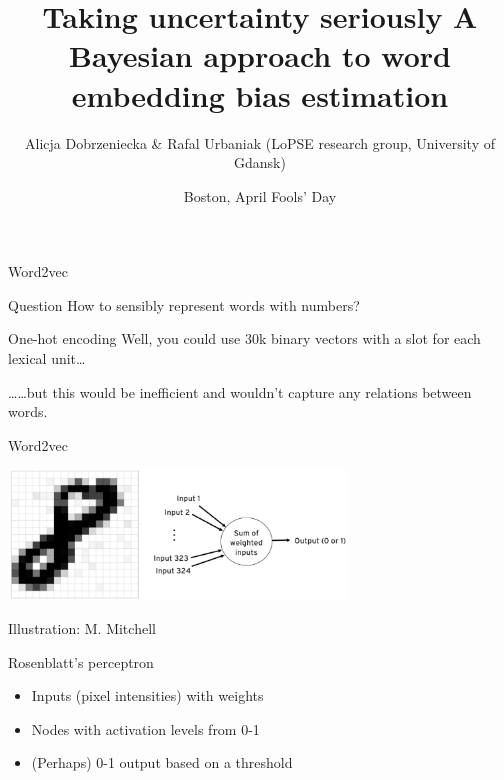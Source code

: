 \documentclass[
  10pt,
  ignorenonframetext,
  x11names, dvipsnames, bibspacing, natbib, table]{beamer}
\title{\Large Taking uncertainty seriously \newline \normalsize A
Bayesian approach to word embedding bias estimation}
\author{Alicja Dobrzeniecka \& Rafal Urbaniak
\footnotesize \newline (LoPSE research group, University of Gdansk)}
\date{Boston, April Fools' Day}
\begin{document}
\frame{\titlepage}

\begin{frame}{Word2vec}
\protect\hypertarget{word2vec}{}
\begin{block}{Question}
\protect\hypertarget{question}{}
How to sensibly represent words with numbers?

\pause
\end{block}

\begin{block}{One-hot encoding}
\protect\hypertarget{one-hot-encoding}{}
Well, you could use 30k binary vectors with a slot for each lexical
unit\dots

\pause

\dots \dots but this would be inefficient and wouldn't capture any
relations between words.
\end{block}
\end{frame}

\begin{frame}{Word2vec}
\protect\hypertarget{word2vec-1}{}
\begin{center}
 \includegraphics[width = 9cm]{images/perceptron1.png}
\end{center}

\vspace{-3mm}

\tiny \hfill \color{gray}Illustration: M. Mitchell \color{black}

\footnotesize

\begin{block}{Rosenblatt's perceptron}
\begin{itemize}
\item Inputs (pixel intensities) with weights
\item Nodes with activation levels from 0-1
\item (Perhaps) 0-1 output based on a threshold
\end{itemize}
\end{block}
\end{frame}
\end{document}
